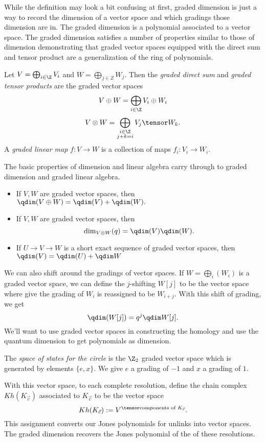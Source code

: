 While the definition may look a bit confusing at first, graded dimension is just a way to record the dimension of a vector space and which gradings those dimension are in. The graded dimension is a polynomial associated to a vector space. The graded dimension satisfies a number of properties similar to those of dimension demonstrating that graded vector spaces equipped with the direct sum and tensor product are a generalization of the ring of polynomials. 
\begin{definition}
Let $V=\bigoplus_{i\in \Z} V_i$ and $W=\bigoplus_{j\in Z} W_j$. Then the \emph{graded direct sum} and \emph{graded tensor products} are the graded vector spaces
\[V\oplus W =\bigoplus_{i\in \Z} V_i\oplus W_i\]
\[V\otimes W= \bigoplus_{\substack{i\in \Z\\ j+k=i}} V_j\tensor W_k.\]
A \emph{graded linear map} $f: V\to W$ is a collection of maps $f_i: V_i\to W_i$. 
\end{definition}
The basic properties of dimension and linear algebra carry through to graded dimension and graded linear algebra. 
\begin{itemize}
\item If $V, W$ are graded vector spaces, then $\qdim(V\oplus W)=\qdim(V)+\qdim(W).$
\item If $V, W$ are graded vector spaces, then \[\dim_{V\otimes W}(q)=\qdim(V)\qdim(W).\]
\item If $U\to V\to W$ is a short exact sequence of graded vector spaces, then $\qdim(V)=\qdim (U)+\qdim W$
\end{itemize}
We can also shift around the gradings of vector spaces. If $W=\bigoplus_i(W_i)$ is a graded vector space, we can define the $j$-shifting $W[j]$ to be the vector space where give the grading of $W_i$ is reassigned to be $W_{i+j}$. With this shift of grading, we get 
\[\qdim(W[j])=q^j \qdim W[j].\]
We'll want to use graded vector spaces in constructing the homology and use the quantum dimension to get polynomials as dimension. 
\begin{definition} 
The \emph{space of states for the circle} is the $\Z_2$ graded vector space which is generated by elements $\{e, x\}$. We give $e$ a grading of $-1$ and $x$  a grading of $1$. 
\end{definition}
With this vector space, to each complete resolution, define the chain complex  $Kh(K_{\vec c})$ associated to $K_{\vec c}$ to be the vector space 
\[Kh(K_{\vec c}):=V^{\tensor \text{components of $K_{\vec c}$}}.\]
This assignment converts our Jones polynomials for unlinks into vector spaces. The graded dimension recovers the Jones polynomial of the of these resolutions.
